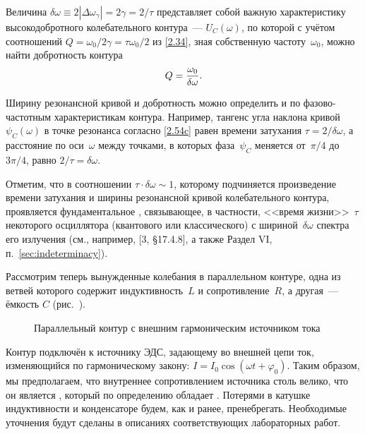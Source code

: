 Величина $\delta\omega\equiv2|\Delta\omega_{\gamma}|=2\gamma=2/\tau$
представляет собой важную характеристику высокодобротного колебательного
контура~---  $U_C(\omega)$, по которой с
учётом соотношений $Q=\omega_0/2\gamma=\tau\omega_0/2$ из \eqref{2.34}, зная
собственную частоту~$\omega_0$, можно найти добротность контура
\begin{equation}\eqmark{2.63}
Q=\dfrac{\omega_0}{\delta\omega}.
\end{equation}

Ширину резонансной кривой и добротность можно определить и по
фазово-частотным характеристикам контура. Например, тангенс угла наклона
кривой $\psi_C(\omega)$ в точке резонанса согласно \eqref{2.54c} равен времени
затухания $\tau=2/\delta\omega$, а расстояние по оси~$\omega$ между точками, в
которых фаза~$\psi_C$ меняется от~$\pi/4$ до~$3\pi/4$, равно
$2/\tau=\delta\omega$.

Отметим, что в соотношении $\tau\cdot\delta\omega\sim1$, которому
подчиняется произведение времени затухания и ширины резонансной кривой
колебательного контура, проявляется фундаментальное , связывающее, в частности, <<время жизни>>~$\tau$ 
некоторого осциллятора (квантового или классического) с шириной~$\delta\omega$ 
спектра его излучения 
(см., например, [3, \S17.4.8], а также Раздел VI, п.~\ref{sec:indeterminacy}).


\label{sec:ires}

Рассмотрим теперь вынужденные колебания в параллельном контуре, одна из ветвей
которого содержит индуктивность~$L$ и сопротивление~$R$, а другая~--- ёмкость
$C$ (рис.~).

\begin{figure}[h!]
\hspace{1.5cm}
		\caption{Параллельный контур с внешним гармоническим источником тока}
\end{figure}

Контур подключён к источнику ЭДС, задающему во внешней цепи ток, изменяющийся по
гармоническому закону: $I=I_0\cos(\omega t+\varphi_0)$. Таким образом, мы
предполагаем, что внутреннее сопротивлением источника столь велико, что он
является , который по определению обладает
. Потерями в катушке
индуктивности и конденсаторе будем, как и ранее, пренебрегать. Необходимые
уточнения будут сделаны в описаниях соответствующих лабораторных работ.

